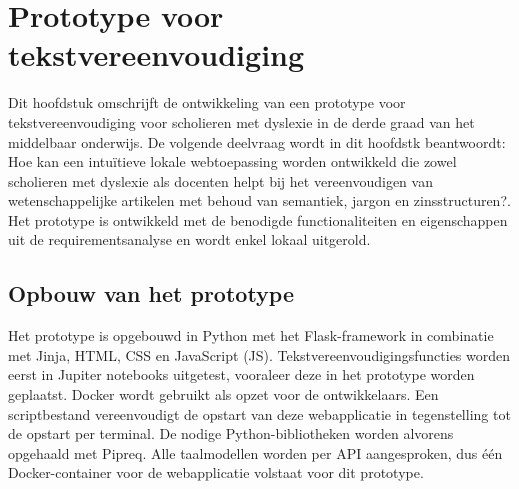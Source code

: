 \chapter{Prototype voor tekstvereenvoudiging}

Dit hoofdstuk omschrijft de ontwikkeling van een prototype voor tekstvereenvoudiging voor scholieren met dyslexie in de derde graad van het middelbaar onderwijs. De volgende deelvraag wordt in dit hoofdstk beantwoordt: Hoe kan een intuïtieve lokale webtoepassing worden ontwikkeld die zowel scholieren met dyslexie als docenten helpt bij het vereenvoudigen van wetenschappelijke artikelen met behoud van semantiek, jargon en zinsstructuren?. Het prototype is ontwikkeld met de benodigde functionaliteiten en eigenschappen uit de requirementsanalyse en wordt enkel lokaal uitgerold.

\section{Opbouw van het prototype}

Het prototype is opgebouwd in Python met het Flask-framework in combinatie met Jinja, HTML, CSS en JavaScript (JS). Tekstvereenvoudigingsfuncties worden eerst in Jupiter notebooks uitgetest, vooraleer deze in het prototype worden geplaatst. Docker wordt gebruikt als opzet voor de ontwikkelaars. Een scriptbestand vereenvoudigt de opstart van deze webapplicatie in tegenstelling tot de opstart per terminal. De nodige Python-bibliotheken worden alvorens opgehaald met Pipreq. Alle taalmodellen worden per API aangesproken, dus één Docker-container voor de webapplicatie volstaat voor dit prototype.


